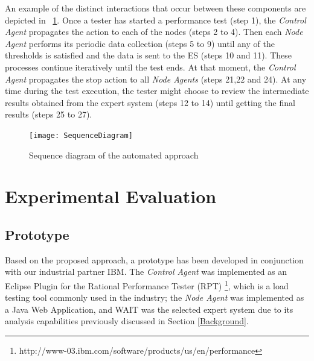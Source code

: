\documentclass[runningheads,a4paper]{llncs}
\begin{document}
An example of the distinct interactions that occur between these
components are depicted in \figurename ~\ref{fig_SeqDiagram}. Once a tester has
started a performance test (step 1), the \emph{Control Agent} propagates the
action to each of the nodes (steps 2 to 4). Then each \emph{Node Agent} performs
its periodic data collection (steps 5 to 9) until any of the thresholds is
satisfied and the data is sent to the ES (steps 10 and 11). These processes
continue iteratively until the test ends. At that moment, the \emph{Control
Agent} propagates the stop action to all \emph{Node Agents} (steps 21,22 and
24). At any time during the test execution, the tester might choose to review
the intermediate results obtained from the expert system (steps 12 to 14) until
getting the final results (steps 25 to 27).

\begin{figure}[!h]
\centering
\texttt{[image: SequenceDiagram]}
\caption{Sequence diagram of the automated approach}
\label{fig_SeqDiagram}
\end{figure}

\vspace{-7pt}
\section{Experimental Evaluation}
\label{ExperimentalEvaluation}


\vspace{-7pt}
\subsection{Prototype}
\vspace{-7pt}
Based on the proposed approach, a prototype has been developed
in conjunction with our industrial partner IBM. The \emph{Control Agent} was
implemented as an Eclipse Plugin for the Rational Performance Tester (RPT)
\footnote{http://www-03.ibm.com/software/products/us/en/performance}, which is a
load testing tool commonly used in the industry; the \emph{Node Agent} was
implemented as a Java Web Application, and WAIT was the selected expert system
due to its analysis capabilities previously discussed in
Section \ref{Background}.
\end{document}
